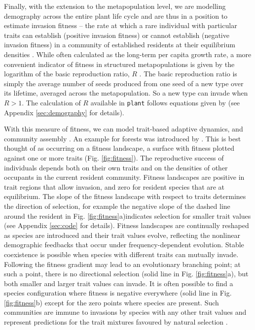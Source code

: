 \documentclass[a4paper,11pt]{article}
\newcommand{\plant}{\texttt{plant}}
\begin{document}
Finally, with the extension to the metapopulation level, we are
modelling demography across the entire plant life cycle and are thus in a
position to estimate invasion fitness -- the rate at which a rare
individual with particular traits can establish (positive invasion fitness) or cannot establish (negative invasion fitness) in a community of
established residents at their equilibrium densities
\citep{Metz-1992}. While often calculated as the
long-term per capita growth rate, a more convenient indicator of
fitness in structured metapopulations is given by the
logarithm of the basic reproduction ratio, \(R\) \citep{Gyllenberg-2001, Metz-2001}. The basic reproduction ratio is simply the average number of seeds produced from one seed of a new type over its lifetime, averaged across the metapopulation. So a new type can
invade when \(R > 1\). The calculation of \(R\) available in
{\plant} follows equations given by \citet{Falster-2015}
(see Appendix \ref{sec:demography} for details).

With this measure of fitness, we can model trait-based adaptive
dynamics, and community assembly \citep{Metz-1992, Geritz-1998,
Chesson-2000, Dieckmann-2004, Brannstrom-2013b}. An example
for forests was introduced by
\citet{Falster-2015}. This is best thought of as occurring on a fitness landscape,
a surface with fitness plotted against one or more traits
(Fig. \ref{fig:fitness}). The reproductive success of individuals
depends both on their own traits and on the densities of other occupants in the current resident community. Fitness landscapes are positive in trait regions that allow invasion, and zero
for resident species that are at equilibrium. The slope of the fitness
landscape with respect to traits determines the direction of selection,
for example the negative slope of the dashed line around the resident
in Fig. \ref{fig:fitness}a)indicates selection for
smaller trait values (see Appendix \ref{sec:code} for
details). Fitness landscapes are continually reshaped as species are
introduced and their trait values evolve, reflecting the nonlinear demographic feedbacks
that occur under frequency-dependent evolution. Stable coexistence is
possible when species with different traits can mutually invade.
Following the fitness gradient may lead to an
evolutionary branching point; at
such a point, there is no directional selection (solid line in
Fig. \ref{fig:fitness}a), but both smaller and larger trait values can invade.
It is often possible to find a species configuration where
fitness is negative everywhere (solid line in Fig. \ref{fig:fitness}b)
except for the zero points where species are present. Such communities
are immune to invasions by species with any other trait values and represent
predictions for the trait mixtures favoured by
natural selection .
\end{document}
